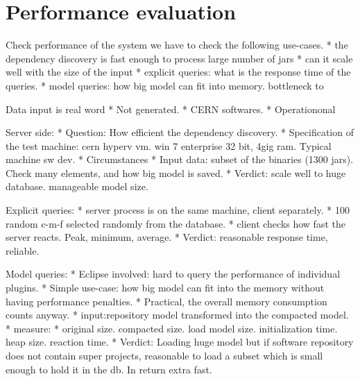 \section{Performance evaluation}
Check performance of the system we have to check the following use-cases.
 * the dependency discovery is fast enough to process large number of jars
 * can it scale well with the size of the input
 * explicit queries: what is the response time of the queries. 
 * model queries: how big model can fit into memory. bottleneck to  
 
Data input is real word
 * Not generated.
 * CERN softwares.
 * Operationonal 
 
Server side:
 * Question: How efficient the dependency discovery.
 * Specification of the test machine: cern hyperv vm. win 7 enterprise 32 bit, 4gig ram. Typical machine sw dev.
 * Circumstances 
 * Input data: subset of the binaries (1300 jars). Check many elements, and how big model is saved.
 * Verdict: scale well to huge database. manageable model size.
 
Explicit queries:
 * server process is on the same machine, client separately.
 * 100 random c-m-f selected randomly from the database. 
 * client checks how fast the server reacts. Peak, minimum, average.
 * Verdict: reasonable response time, reliable.
 
Model queries:
 * Eclipse involved: hard to query the performance of individual plugins.
 * Simple use-case: how big model can fit into the memory without having
 performance penalties.
 * Practical, the overall memory consumption counts anyway.
 * input:repository model transformed into the compacted model.
 * measure:
   * original size. compacted size. load model size. initialization time. heap
   size. reaction time.
 * Verdict: Loading huge model but if  software repository does not contain
 super projects, reasonable to load a subset which is small enough to  hold it
 in the db. In return extra fast. 
